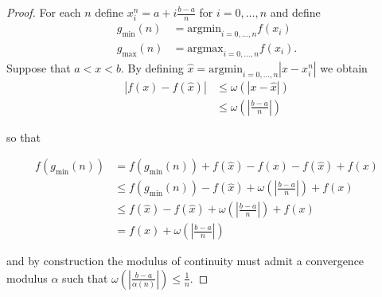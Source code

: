 \documentclass{article}
\newcommand{\abs}[1]{\left|#1\right|}
\newcommand{\ap}[1]{\left(#1\right)}
\newcommand{\argmin}{\text{argmin}}
\newcommand{\argmax}{\text{argmax}}
\begin{document}
\begin{proof}
  For each $n$ define $x_i^n = a + i\frac{b-a}{n}$ for $i=0,\ldots,n$ and define
  \begin{align*}
    g_{\min}(n) &= \argmin_{i=0,\ldots,n} f(x_i) \\
    g_{\max}(n) &= \argmax_{i=0,\ldots,n} f(x_i).
  \end{align*}
  Suppose that $a<x<b.$
  By defining $\hat{x}=\argmin_{i=0,\ldots,n} |x-x_i^n|$ we obtain
  \begin{align*}
    |f(x)-f(\hat{x})| &\leq \omega(|x-\hat{x}|)\\
                      &\leq \omega\ap{\abs{\frac{b-a}{n}}}
  \end{align*}

  so that

  \begin{align*}
    f(g_{\min}(n)) &= f(g_{\min}(n))+f(\hat{x})-f(x) -f(\hat{x})+f(x) \\
                   &\leq f(g_{\min}(n))-f(\hat{x})+\omega\ap{\abs{\frac{b-a}{n}}}+f(x) \\
                   &\leq f(\hat{x})-f(\hat{x}) + \omega\ap{\abs{\frac{b-a}{n}}}+f(x)  \\
                   &=    f(x) + \omega\ap{\abs{\frac{b-a}{n}}}
  \end{align*}

  and by construction the modulus of continuity must admit a convergence modulus $\alpha$ such that
  $\omega\ap{\abs{\frac{b-a}{\alpha(n)}}} \leq \frac{1}{n}.$






\end{proof}
\end{document}
